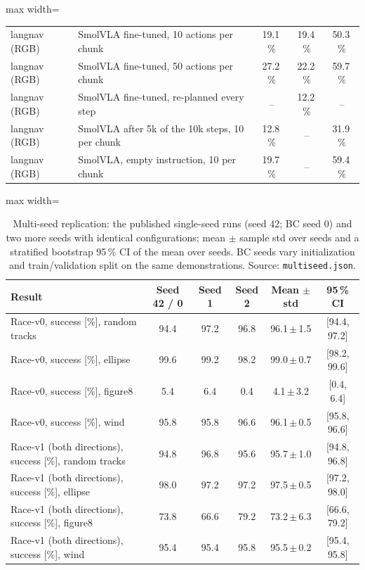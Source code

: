 \begin{table}[!htbp]
\begin{adjustbox}{max width=\linewidth}
\begin{tabular}{llccc}
langnav (RGB) & SmolVLA fine-tuned, 10 actions per chunk & 19.1\,\% & 19.4\,\% & 50.3\,\%\\
langnav (RGB) & SmolVLA fine-tuned, 50 actions per chunk & 27.2\,\% & 22.2\,\% & 59.7\,\%\\
langnav (RGB) & SmolVLA fine-tuned, re-planned every step & -- & 12.2\,\% & --\\
langnav (RGB) & SmolVLA after 5k of the 10k steps, 10 per chunk & 12.8\,\% & -- & 31.9\,\%\\
langnav (RGB) & SmolVLA, empty instruction, 10 per chunk & 19.7\,\% & -- & 59.4\,\%\\
\bottomrule\end{tabular}\end{adjustbox}
\end{table}

\begin{table}[!htbp]\centering\small\caption{Multi-seed replication: the published single-seed runs (seed 42; BC seed 0) and two more seeds with identical configurations; mean $\pm$ sample std over seeds and a stratified bootstrap 95\,\% CI of the mean over seeds. BC seeds vary initialization and train/validation split on the same demonstrations. Source: \texttt{multiseed.json}.}\label{tab:fw_multiseed}
\begin{adjustbox}{max width=\linewidth}\begin{tabular}{lccccc}\toprule
Result & Seed 42 / 0 & Seed 1 & Seed 2 & Mean $\pm$ std & 95\,\% CI\\\midrule
Race-v0, success [\%], random tracks & 94.4 & 97.2 & 96.8 & 96.1\,$\pm$\,1.5 & [94.4, 97.2]\\
Race-v0, success [\%], ellipse & 99.6 & 99.2 & 98.2 & 99.0\,$\pm$\,0.7 & [98.2, 99.6]\\
Race-v0, success [\%], figure8 & 5.4 & 6.4 & 0.4 & 4.1\,$\pm$\,3.2 & [0.4, 6.4]\\
Race-v0, success [\%], wind & 95.8 & 95.8 & 96.6 & 96.1\,$\pm$\,0.5 & [95.8, 96.6]\\
Race-v1 (both directions), success [\%], random tracks & 94.8 & 96.8 & 95.6 & 95.7\,$\pm$\,1.0 & [94.8, 96.8]\\
Race-v1 (both directions), success [\%], ellipse & 98.0 & 97.2 & 97.2 & 97.5\,$\pm$\,0.5 & [97.2, 98.0]\\
Race-v1 (both directions), success [\%], figure8 & 73.8 & 66.6 & 79.2 & 73.2\,$\pm$\,6.3 & [66.6, 79.2]\\
Race-v1 (both directions), success [\%], wind & 95.4 & 95.4 & 95.8 & 95.5\,$\pm$\,0.2 & [95.4, 95.8]\\

\end{tabular}
\end{adjustbox}
\end{table}
